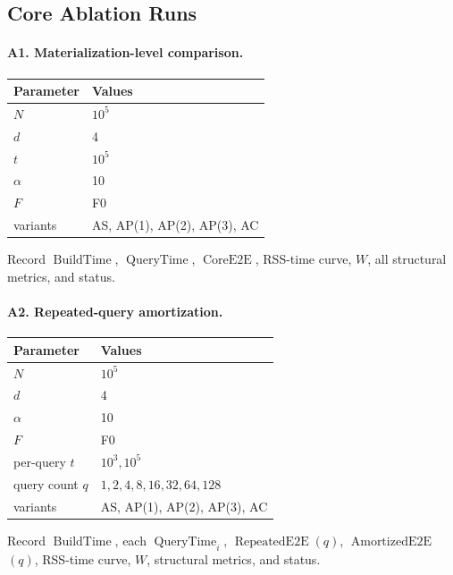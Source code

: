 \documentclass[11pt]{article}
\newcommand{\AC}{\textsc{AC}}
\newcommand{\AS}{\textsc{AS}}
\newcommand{\AP}{\textsc{AP}}
\newcommand{\BuildTime}{\ensuremath{\operatorname{BuildTime}}}
\newcommand{\QueryTime}{\ensuremath{\operatorname{QueryTime}}}
\newcommand{\CoreE}{\ensuremath{\operatorname{CoreE2E}}}
\newcommand{\RepeatedE}{\ensuremath{\operatorname{RepeatedE2E}}}
\newcommand{\AmortizedE}{\ensuremath{\operatorname{AmortizedE2E}}}
\begin{document}
\subsection{Core Ablation Runs}

\paragraph{A1. Materialization-level comparison.}
\begin{center}
\begin{tabularx}{0.82\linewidth}{@{}lY@{}}
\toprule
Parameter & Values \\
\midrule
$N$ & $10^5$ \\
$d$ & 4 \\
$t$ & $10^5$ \\
$\alpha$ & 10 \\
$F$ & F0 \\
variants & \AS, \AP(1), \AP(2), \AP(3), \AC \\
\bottomrule
\end{tabularx}
\end{center}
Record \BuildTime, \QueryTime, \CoreE, RSS-time curve, $W$, all structural metrics, and status.

\paragraph{A2. Repeated-query amortization.}
\begin{center}
\begin{tabularx}{0.82\linewidth}{@{}lY@{}}
\toprule
Parameter & Values \\
\midrule
$N$ & $10^5$ \\
$d$ & 4 \\
$\alpha$ & 10 \\
$F$ & F0 \\
per-query $t$ & $10^3,10^5$ \\
query count $q$ & $1,2,4,8,16,32,64,128$ \\
variants & \AS, \AP(1), \AP(2), \AP(3), \AC \\
\bottomrule
\end{tabularx}
\end{center}
Record \BuildTime, each $\QueryTime_i$, \RepeatedE$(q)$, \AmortizedE$(q)$, RSS-time curve, $W$, structural metrics, and status.
\end{document}

